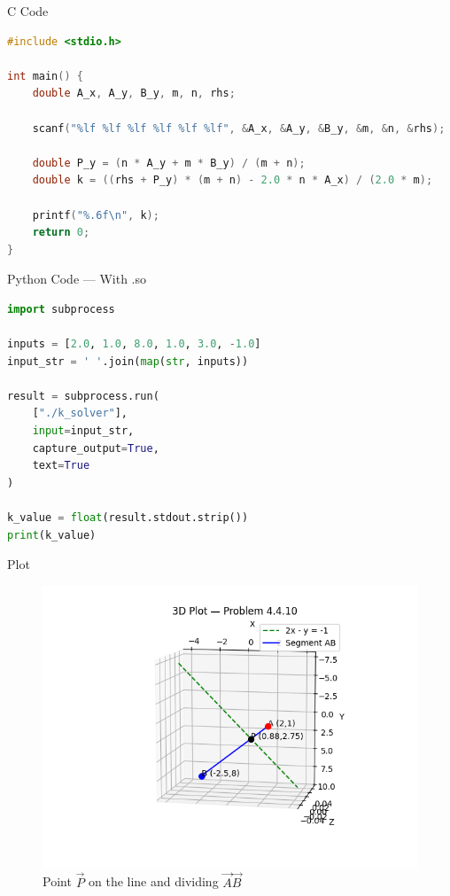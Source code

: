 \documentclass{beamer}
\begin{document}
\begin{frame}[fragile]{C Code }
\begin{lstlisting}[language=C]
#include <stdio.h>

int main() {
    double A_x, A_y, B_y, m, n, rhs;

    scanf("%lf %lf %lf %lf %lf %lf", &A_x, &A_y, &B_y, &m, &n, &rhs);

    double P_y = (n * A_y + m * B_y) / (m + n);
    double k = ((rhs + P_y) * (m + n) - 2.0 * n * A_x) / (2.0 * m);

    printf("%.6f\n", k);
    return 0;
}
\end{lstlisting}
\end{frame}


\begin{frame}[fragile]{Python Code — With .so}
\begin{lstlisting}[language=Python]
import subprocess

inputs = [2.0, 1.0, 8.0, 1.0, 3.0, -1.0]
input_str = ' '.join(map(str, inputs))

result = subprocess.run(
    ["./k_solver"],
    input=input_str,
    capture_output=True,
    text=True
)

k_value = float(result.stdout.strip())
print(k_value)
\end{lstlisting}
\end{frame}






\begin{frame}{Plot}
\begin{figure}[H]
\centering
\includegraphics[width=0.78\linewidth]{Figs/Fig1.png}
\caption{Point \( \vec{P} \) on the line and dividing \( \vec{A}\vec{B} \)}
\end{figure}
\end{frame}
\end{document}
